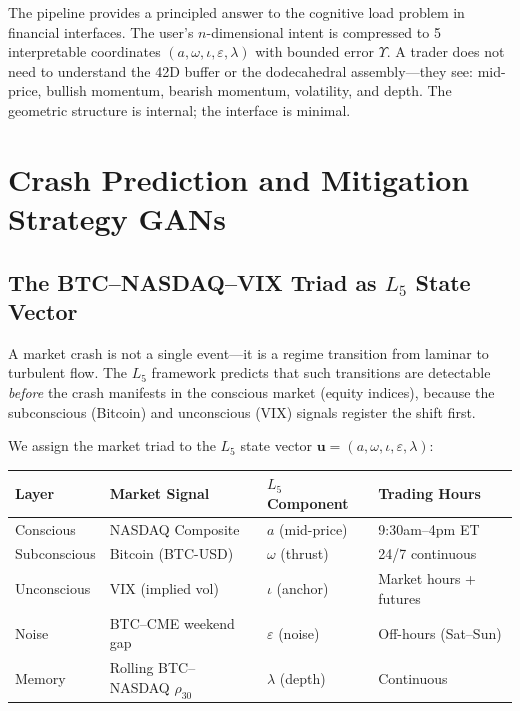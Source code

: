 \begin{remark}
The pipeline provides a principled answer to the cognitive load problem in financial interfaces. The user's $n$-dimensional intent is compressed to 5 interpretable coordinates $(a, \omega, \iota, \varepsilon, \lambda)$ with bounded error $\Upsilon$. A trader does not need to understand the 42D buffer or the dodecahedral assembly---they see: mid-price, bullish momentum, bearish momentum, volatility, and depth. The geometric structure is internal; the interface is minimal.
\end{remark}

\section{Crash Prediction and Mitigation Strategy GANs}\label{sec:crash_pred}

\subsection{The BTC--NASDAQ--VIX Triad as $L_5$ State Vector}

A market crash is not a single event---it is a regime transition from laminar to turbulent flow. The $L_5$ framework predicts that such transitions are detectable \emph{before} the crash manifests in the conscious market (equity indices), because the subconscious (Bitcoin) and unconscious (VIX) signals register the shift first.

We assign the market triad to the $L_5$ state vector $\mathbf{u} = (a, \omega, \iota, \varepsilon, \lambda)$:

\begin{center}
\begin{tabular}{@{}llll@{}}
\toprule
\textbf{Layer} & \textbf{Market Signal} & \textbf{$L_5$ Component} & \textbf{Trading Hours} \\
\midrule
Conscious & NASDAQ Composite & $a$ (mid-price) & 9:30am--4pm ET \\
Subconscious & Bitcoin (BTC-USD) & $\omega$ (thrust) & 24/7 continuous \\
Unconscious & VIX (implied vol) & $\iota$ (anchor) & Market hours + futures \\
Noise & BTC--CME weekend gap & $\varepsilon$ (noise) & Off-hours (Sat--Sun) \\
Memory & Rolling BTC--NASDAQ $\rho_{30}$ & $\lambda$ (depth) & Continuous \\
\bottomrule
\end{tabular}
\end{center}

